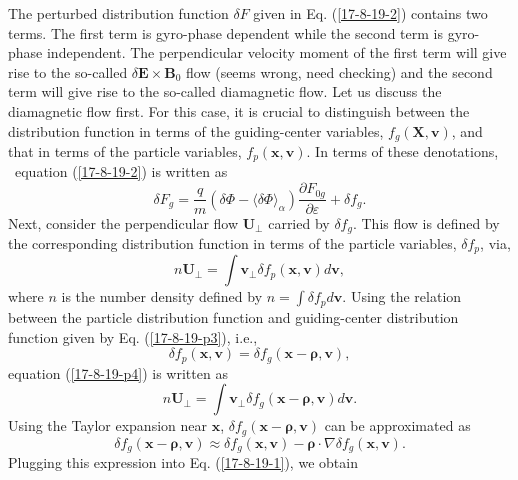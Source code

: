 \documentclass{article}
\newcommand{\tmmathbf}[1]{\ensuremath{\boldsymbol{#1}}}
\begin{document}
The perturbed distribution function $\delta F$ given in Eq. (\ref{17-8-19-2})
contains two terms. The first term is gyro-phase dependent while the second
term is gyro-phase independent. The perpendicular velocity moment of the first
term will give rise to the so-called $\delta \mathbf{E} \times \mathbf{B}_0$
flow (seems wrong, need checking) and the second term will give rise to the
so-called diamagnetic flow. Let us discuss the diamagnetic flow first. For
this case, it is crucial to distinguish between the distribution function in
terms of the guiding-center variables, $f_g (\mathbf{X}, \mathbf{v})$, and
that in terms of the particle variables, $f_p (\mathbf{x}, \mathbf{v})$. In
terms of these denotations, \ equation (\ref{17-8-19-2}) is written as
\begin{equation}
  \delta F_g = \frac{q}{m} (\delta \Phi - \langle \delta \Phi
  \rangle_{\alpha}) \frac{\partial F_{0 g}}{\partial \varepsilon} + \delta f_g
  .
\end{equation}
Next, consider the perpendicular flow $\mathbf{U}_{\perp}$ carried by $\delta
f_g$. This flow is defined by the corresponding distribution function in terms
of the particle variables, $\delta f_p$, via,
\begin{equation}
  \label{17-8-19-p4} n\mathbf{U}_{\perp} = \int \mathbf{v}_{\perp} \delta f_p
  (\mathbf{x}, \mathbf{v}) d\mathbf{v},
\end{equation}
where $n$ is the number density defined by $n = \int \delta f_p d\mathbf{v}$.
Using the relation between the particle distribution function and
guiding-center distribution function given by Eq. (\ref{17-8-19-p3}), i.e.,
\begin{equation}
  \delta f_p (\mathbf{x}, \mathbf{v}) = \delta f_g
  (\mathbf{x}-\tmmathbf{\rho}, \mathbf{v}),
\end{equation}
equation (\ref{17-8-19-p4}) is written as
\begin{equation}
  \label{17-8-19-1} n\mathbf{U}_{\perp} = \int \mathbf{v}_{\perp} \delta f_g
  (\mathbf{x}-\tmmathbf{\rho}, \mathbf{v}) d\mathbf{v}.
\end{equation}
Using the Taylor expansion near $\mathbf{x}$, $\delta f_g
(\mathbf{x}-\tmmathbf{\rho}, \mathbf{v})$ can be approximated as
\begin{equation}
  \delta f_g (\mathbf{x}-\tmmathbf{\rho}, \mathbf{v}) \approx \delta f_g
  (\mathbf{x}, \mathbf{v}) -\tmmathbf{\rho} \cdot \nabla \delta f_g
  (\mathbf{x}, \mathbf{v}) .
\end{equation}
Plugging this expression into Eq. (\ref{17-8-19-1}), we obtain
\end{document}
